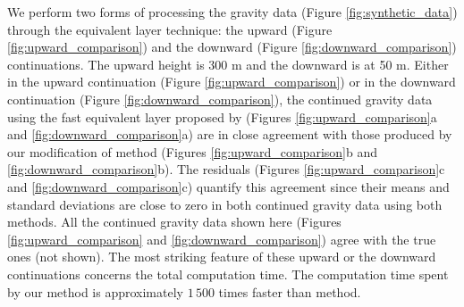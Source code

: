 We perform two forms of processing the gravity data (Figure \ref{fig:synthetic_data}) through the equivalent layer 
technique: the upward (Figure \ref{fig:upward_comparison}) and the downward (Figure \ref{fig:downward_comparison}) 
continuations. The upward height is 300 m and the downward  is at 50 m.   Either in the upward continuation 
(Figure \ref{fig:upward_comparison}) or in the downward continuation (Figure \ref{fig:downward_comparison}), the 
continued gravity data using the fast equivalent layer proposed by \citet{siqueira-etal2017} 
(Figures \ref{fig:upward_comparison}a and \ref{fig:downward_comparison}a) are in close agreement with those produced 
by our modification of \citet{siqueira-etal2017} method (Figures \ref{fig:upward_comparison}b and 
\ref{fig:downward_comparison}b). The residuals (Figures \ref{fig:upward_comparison}c and \ref{fig:downward_comparison}c)
quantify this agreement since their means and standard deviations are close to zero in both continued gravity data using 
both methods.  All the continued gravity data shown here (Figures \ref{fig:upward_comparison} and 
\ref{fig:downward_comparison}) agree with the true ones (not shown). The most striking feature of these upward or 
the downward continuations concerns the total computation time. The computation time spent by our method is 
approximately $1\,500$ times faster than \citet{siqueira-etal2017} method. 